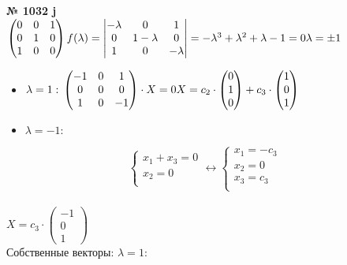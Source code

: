 \documentclass[12pt]{article}
\newenvironment{task}[1][0]{\vspace{.5cm} {\textbf{№ #1} \vspace{.5cm}\\ }}{}
\begin{document}
\begin{task}[1032 j]
$
	\begin{pmatrix}
		0 & 0 & 1\\
		0 & 1 & 0\\
		1 & 0 & 0\\
	\end{pmatrix}\\
f(\lambda) = 
\begin{vmatrix}
	-\lambda & 0 & 1\\
	0 & 1-\lambda & 0\\
	1 & 0 & -\lambda\\
\end{vmatrix} = -\lambda^3+\lambda^2+\lambda-1=0\\
\lambda = \pm1\\$
\begin{itemize}
	\item {
	$\lambda = 1:\\
	\begin{pmatrix}
		-1 & 0 & 1\\
		0 & 0 & 0\\
		1 & 0 & -1
	\end{pmatrix} \cdot X = 0\\
	X = c_2 \cdot
	\begin{pmatrix}
		0 \\ 1 \\ 0\\
	\end{pmatrix} + c_3 \cdot
	\begin{pmatrix}
		1\\0\\1\\
	\end{pmatrix}\\$
}
\item{$\lambda = -1:$
}
\end{itemize}

{
\begin{equation*}
	\begin{cases}
		x_1+x_3=0\\
		x_2=0\\
	\end{cases} \leftrightarrow
\begin{cases}
	x_1=-c_3\\
	x_2=0\\
	x_3=c_3\\
\end{cases}
\end{equation*}\\
$X = c_3 \cdot
\begin{pmatrix}
	-1\\0\\1
\end{pmatrix}$}\\
Собственные векторы:
$\lambda=1:$
\end{task}
\end{document}
